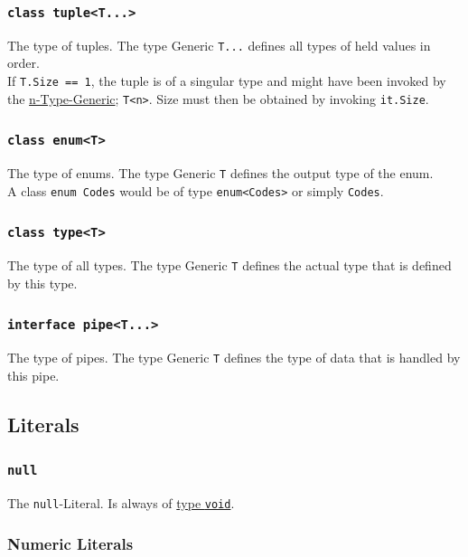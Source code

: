 \documentclass{docs}
\begin{document}
    \label{typeTuple}
    \subsubsection{\texttt{class tuple<T...>}}
    The type of tuples. The type Generic \texttt{T...} defines all types of held values in order.
    \\
    If \texttt{T.Size == 1}, the tuple is of a singular type and might have been invoked by the \hyperref[typeGenN]{n-Type-Generic}; \texttt{T<n>}.
    Size must then be obtained by invoking \texttt{it.Size}.
    
    \label{typeEnum}
    \subsubsection{\texttt{class enum<T>}}
    The type of enums. The type Generic \texttt{T} defines the output type of the enum.
    \\
    A class \texttt{enum Codes} would be of type \texttt{enum<Codes>} or simply \texttt{Codes}.
    
    \label{typeType}
    \subsubsection{\texttt{class type<T>}}
    The type of all types. The type Generic \texttt{T} defines the actual type that is defined by this type.

    \label{typePipe}
    \subsubsection{\texttt{interface pipe<T...>}}
    The type of pipes. The type Generic \texttt{T} defines the type of data that is handled by this pipe.
    
    \subsection{Literals}
    
    \label{litNull}
    \subsubsection{\texttt{null}}
    The \texttt{null}-Literal. Is always of \hyperref[typeVoid]{type \texttt{void}}.
    
    \label{litNum}
    \subsubsection{Numeric Literals}
    
\end{document}
